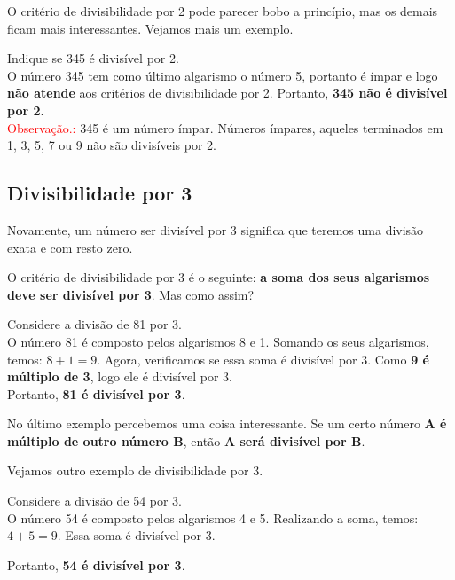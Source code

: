 O critério de divisibilidade por 2 pode parecer bobo a princípio, mas os demais ficam mais interessantes. Vejamos mais um exemplo.

\begin{exemplo}
    Indique se 345 é divisível por 2. \\

    O número 345 tem como último algarismo o número 5, portanto é ímpar e logo \textbf{não atende} aos critérios de divisibilidade por 2. Portanto, \textbf{345 não é divisível por 2}.\\

    \textcolor{red}{Observação.:} 345 é um número ímpar. Números ímpares, aqueles terminados em 1, 3, 5, 7 ou 9 não são divisíveis por 2.    
\end{exemplo}

\subsection{Divisibilidade por 3}
Novamente, um número ser divisível por 3 significa que teremos uma divisão exata e com resto zero. 

O critério de divisibilidade por 3 é o seguinte: \textbf{a soma dos seus algarismos deve ser divisível por 3}. Mas como assim?

\begin{exemplo}
    Considere a divisão de 81 por 3. \\

    O número 81 é composto pelos algarismos 8 e 1. Somando os seus algarismos, temos: \(8+1=9\). Agora, verificamos se essa soma é divisível por 3. Como \textbf{9 é múltiplo de 3}, logo ele é divisível por 3.\\

    Portanto, \textbf{81 é divisível por 3}.
\end{exemplo}

\begin{tcolorbox}[title = IMPORTANTE]
    No último exemplo percebemos uma coisa interessante. Se um certo número \textbf{A é múltiplo de outro número B}, então \textbf{A será divisível por B}. 
\end{tcolorbox}

Vejamos outro exemplo de divisibilidade por 3.

\begin{exemplo}
    Considere a divisão de 54 por 3.\\

    O número 54 é composto pelos algarismos 4 e 5. Realizando a soma, temos: \(4+5=9\). Essa soma é divisível por 3. 

    Portanto, \textbf{54 é divisível por 3}.
\end{exemplo}

